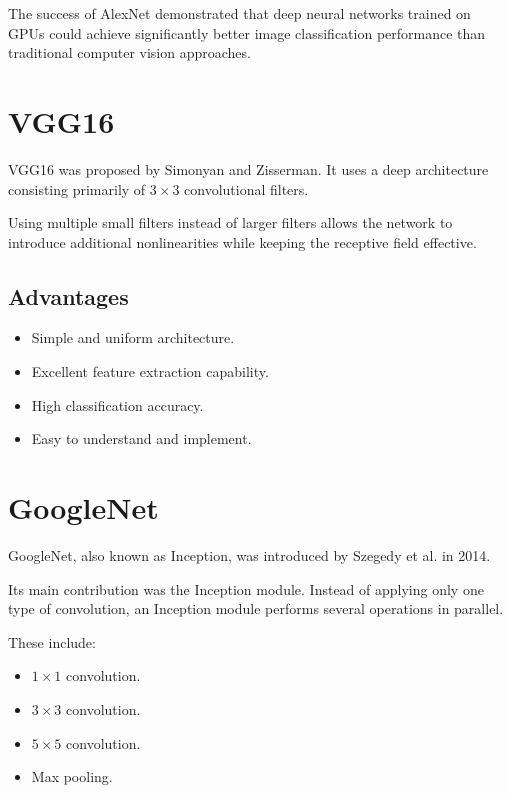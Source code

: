 \documentclass[12pt,a4paper]{article}
\begin{document}
The success of AlexNet demonstrated that deep neural networks trained on GPUs could achieve significantly better image classification performance than traditional computer vision approaches.


\section{VGG16}

VGG16 was proposed by Simonyan and Zisserman. It uses a deep architecture consisting primarily of $3\times3$ convolutional filters.

Using multiple small filters instead of larger filters allows the network to introduce additional nonlinearities while keeping the receptive field effective.

\subsection{Advantages}

\begin{itemize}
    \item Simple and uniform architecture.
    \item Excellent feature extraction capability.
    \item High classification accuracy.
    \item Easy to understand and implement.
\end{itemize}


\section{GoogleNet}

GoogleNet, also known as Inception, was introduced by Szegedy et al. in 2014.

Its main contribution was the Inception module. Instead of applying only one type of convolution, an Inception module performs several operations in parallel.

These include:

\begin{itemize}
    \item $1\times1$ convolution.
    \item $3\times3$ convolution.
    \item $5\times5$ convolution.
    \item Max pooling.
\end{itemize}
\end{document}
